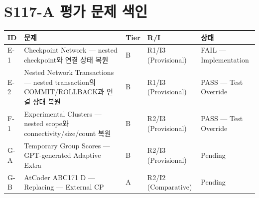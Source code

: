 \chapter{S117-A 평가 문제 색인}
\begin{longtable}{p{1.8cm}p{5.5cm}p{2.0cm}p{1.8cm}p{2.2cm}}
\toprule
\textbf{ID} & \textbf{문제} & \textbf{Tier} & \textbf{R/I} & \textbf{상태} \\
\midrule
E-1 & Checkpoint Network --- nested checkpoint와 연결 상태 복원 & B & R1/I3 (Provisional) & FAIL --- Implementation \\
E-2 & Nested Network Transactions --- nested transaction의 COMMIT/ROLLBACK과 연결 상태 복원 & B & R1/I3 (Provisional) & PASS --- Test Override \\
F-1 & Experimental Clusters --- nested scope와 connectivity/size/count 복원 & B & R2/I3 (Provisional) & PASS --- Test Override \\
G-A & Temporary Group Scores --- GPT-generated Adaptive Extra & B & R2/I3 (Provisional) & Pending \\
G-B & AtCoder ABC171 D --- Replacing --- External CP & A & R2/I2 (Comparative) & Pending \\
\bottomrule
\end{longtable}
